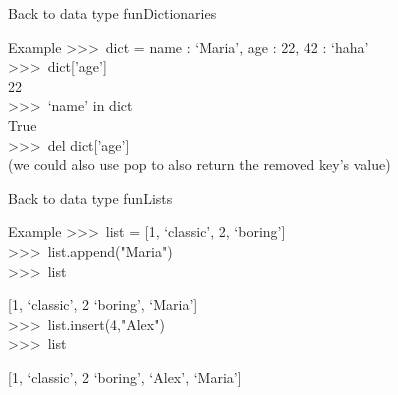 \documentclass{beamer}
\begin{document}
  \begin{frame}{Back to data type fun}{Dictionaries}

    \begin{block}{Example}
      \scriptsize
      \textgreater\textgreater\textgreater \  dict = \textbraceleft name : `Maria', age : 22, 42 : `haha' \textbraceright \\
      
      \textgreater\textgreater\textgreater \ dict['age']\\
        22\\
      \textgreater\textgreater\textgreater \ `name' in dict\\
        True\\
      \textgreater\textgreater\textgreater \ del dict['age']\\
      (we could also use pop to also return the removed key's value)
    \end{block}
    
  \end{frame}

  \begin{frame}{Back to data type fun}{Lists}

    \begin{block}{Example}
      \scriptsize
      \textgreater\textgreater\textgreater \ list = [1, `classic', 2, `boring']\\

      \textgreater\textgreater\textgreater \ list.append("Maria")\\
      \textgreater\textgreater\textgreater \ list

        [1, `classic', 2 `boring', `Maria']\\
      \textgreater\textgreater\textgreater \ list.insert(4,"Alex")\\

      \textgreater\textgreater\textgreater \ list

        [1, `classic', 2 `boring', `Alex', `Maria']
    \end{block}
    
  \end{frame}
\end{document}
